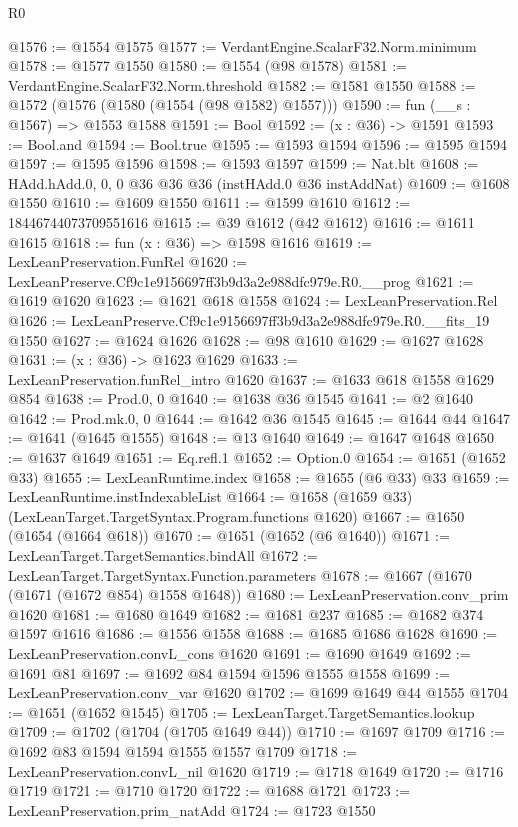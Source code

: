 \begin{lexlean}{R0}
\begin{coremodule}
@1576 := @1554 @1575
@1577 := VerdantEngine.ScalarF32.Norm.minimum
@1578 := @1577 @1550
@1580 := @1554 (@98 @1578)
@1581 := VerdantEngine.ScalarF32.Norm.threshold
@1582 := @1581 @1550
@1588 := @1572 (@1576 (@1580 (@1554 (@98 @1582) @1557)))
@1590 := fun (__s : @1567) => @1553 @1588
@1591 := Bool
@1592 := (x : @36) -> @1591
@1593 := Bool.and
@1594 := Bool.true
@1595 := @1593 @1594
@1596 := @1595 @1594
@1597 := @1595 @1596
@1598 := @1593 @1597
@1599 := Nat.blt
@1608 := HAdd.hAdd.{0, 0, 0} @36 @36 @36 (instHAdd.{0} @36 instAddNat)
@1609 := @1608 @1550
@1610 := @1609 @1550
@1611 := @1599 @1610
@1612 := 18446744073709551616
@1615 := @39 @1612 (@42 @1612)
@1616 := @1611 @1615
@1618 := fun (x : @36) => @1598 @1616
@1619 := LexLeanPreservation.FunRel
@1620 := LexLeanPreserve.Cf9c1e9156697ff3b9d3a2e988dfc979e.R0.__prog
@1621 := @1619 @1620
@1623 := @1621 @618 @1558
@1624 := LexLeanPreservation.Rel
@1626 := LexLeanPreserve.Cf9c1e9156697ff3b9d3a2e988dfc979e.R0.__fits_19 @1550
@1627 := @1624 @1626
@1628 := @98 @1610
@1629 := @1627 @1628
@1631 := (x : @36) -> @1623 @1629
@1633 := LexLeanPreservation.funRel_intro @1620
@1637 := @1633 @618 @1558 @1629 @854
@1638 := Prod.{0, 0}
@1640 := @1638 @36 @1545
@1641 := @2 @1640
@1642 := Prod.mk.{0, 0}
@1644 := @1642 @36 @1545
@1645 := @1644 @44
@1647 := @1641 (@1645 @1555)
@1648 := @13 @1640
@1649 := @1647 @1648
@1650 := @1637 @1649
@1651 := Eq.refl.{1}
@1652 := Option.{0}
@1654 := @1651 (@1652 @33)
@1655 := LexLeanRuntime.index
@1658 := @1655 (@6 @33) @33
@1659 := LexLeanRuntime.instIndexableList
@1664 := @1658 (@1659 @33) (LexLeanTarget.TargetSyntax.Program.functions @1620)
@1667 := @1650 (@1654 (@1664 @618))
@1670 := @1651 (@1652 (@6 @1640))
@1671 := LexLeanTarget.TargetSemantics.bindAll
@1672 := LexLeanTarget.TargetSyntax.Function.parameters
@1678 := @1667 (@1670 (@1671 (@1672 @854) @1558 @1648))
@1680 := LexLeanPreservation.conv_prim @1620
@1681 := @1680 @1649
@1682 := @1681 @237
@1685 := @1682 @374 @1597 @1616
@1686 := @1556 @1558
@1688 := @1685 @1686 @1628
@1690 := LexLeanPreservation.convL_cons @1620
@1691 := @1690 @1649
@1692 := @1691 @81
@1697 := @1692 @84 @1594 @1596 @1555 @1558
@1699 := LexLeanPreservation.conv_var @1620
@1702 := @1699 @1649 @44 @1555
@1704 := @1651 (@1652 @1545)
@1705 := LexLeanTarget.TargetSemantics.lookup
@1709 := @1702 (@1704 (@1705 @1649 @44))
@1710 := @1697 @1709
@1716 := @1692 @83 @1594 @1594 @1555 @1557 @1709
@1718 := LexLeanPreservation.convL_nil @1620
@1719 := @1718 @1649
@1720 := @1716 @1719
@1721 := @1710 @1720
@1722 := @1688 @1721
@1723 := LexLeanPreservation.prim_natAdd
@1724 := @1723 @1550

\end{coremodule}
\end{lexlean}
